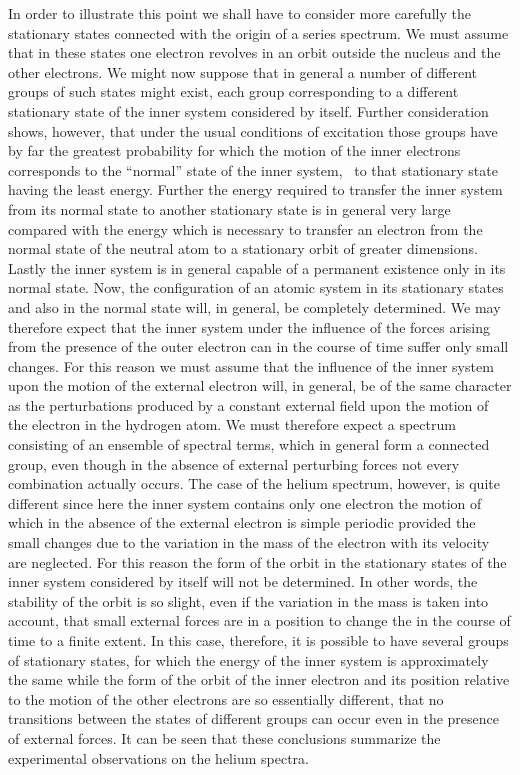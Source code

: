 In order to illustrate this point we shall have to consider more
carefully the stationary states connected with the origin of a series
spectrum. We must assume that in these states one electron revolves
in an orbit outside the nucleus and the other electrons. We
might now suppose that in general a number of different groups of
such states might exist, each group corresponding to a different
stationary state of the inner system considered by itself. Further
consideration shows, however, that under the usual conditions of
excitation those groups have by far the greatest probability for which
the motion of the inner electrons corresponds to the ``normal'' state
of the inner system, \ie\ to that stationary state having the least
energy. Further the energy required to transfer the inner system
from its normal state to another stationary state is in general very
large compared with the energy which is necessary to transfer an
electron from the normal state of the neutral atom to a stationary
orbit of greater dimensions. Lastly the inner system is in general
capable of a permanent existence only in its normal state. Now,
the configuration of an atomic system in its stationary states and
also in the normal state will, in general, be completely determined.
We may therefore expect that the inner system under the influence
of the forces arising from the presence of the outer electron can in
the course of time suffer only small changes. For this reason we
must assume that the influence of the inner system upon the motion
of the external electron will, in general, be of the same character
as the perturbations produced by a constant external field upon
the motion of the electron in the hydrogen atom. We must therefore
expect a spectrum consisting of an ensemble of spectral terms,
which in general form a connected group, even though in the
absence of external perturbing forces not every combination actually
occurs. The case of the helium spectrum, however, is quite different
since here the inner system contains only one electron the motion
of which in the absence of the external electron is simple periodic
provided the small changes due to the variation in the mass of the
electron with its velocity are neglected. For this reason the form of
the orbit in the stationary states of the inner system considered by
itself will not be determined. In other words, the stability of the
orbit is so slight, even if the variation in the mass is taken into
account, that small external forces are in a position to change the
 in the course of time to a finite extent. In this case,
therefore, it is possible to have several groups of stationary states,
for which the energy of the inner system is approximately the same
while the form of the orbit of the inner electron and its position
relative to the motion of the other electrons are so essentially
different, that no transitions between the states of different groups
can occur even in the presence of external forces. It can be seen
that these conclusions summarize the experimental observations
on the helium spectra.

